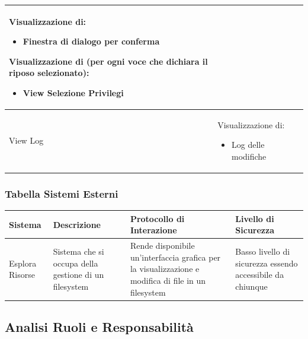 \documentclass[a4paper, 11pt]{article}
\let\newline\\
\begin{document}
\begin{adjustwidth}{-1.5cm}{-1.5cm}
\begin{center}
\begin{longtable}{|p{5cm}|p{5cm}|p{5cm}|}
        Visualizzazione di:
        \begin{itemize}
            \item Finestra di dialogo per conferma
        \end{itemize} 
        
        Visualizzazione di (per ogni voce che dichiara il riposo selezionato):
        \begin{itemize}
            \item View Selezione Privilegi
        \end{itemize} &  \\ \hline
        
        View Log & 
        Visualizzazione di:
        \begin{itemize}
            \item Log delle modifiche
        \end{itemize} &  \\ \hline

        \end{longtable}
    \end{center}
\end{adjustwidth}

\subsubsection*{Tabella Sistemi Esterni}
\begin{adjustwidth}{-1.5cm}{-1.5cm}
\begin{center}
    \begin{tabular}{|p{2.5cm}|p{5cm}|p{4cm}|p{4cm}|}
        \hline
        \textbf{Sistema} & \textbf{Descrizione} & \textbf{Protocollo di \newline Interazione} & \textbf{Livello di Sicurezza} \\ \hline
        Esplora Risorse & Sistema che si occupa della gestione di un filesystem & Rende disponibile un’interfaccia grafica per la visualizzazione e modifica di file in un filesystem & Basso livello di sicurezza essendo accessibile da chiunque \\ \hline
    \end{tabular}
\end{center}
\end{adjustwidth}


\clearpage
\newpage
\subsection{Analisi Ruoli e Responsabilità}
\end{document}
